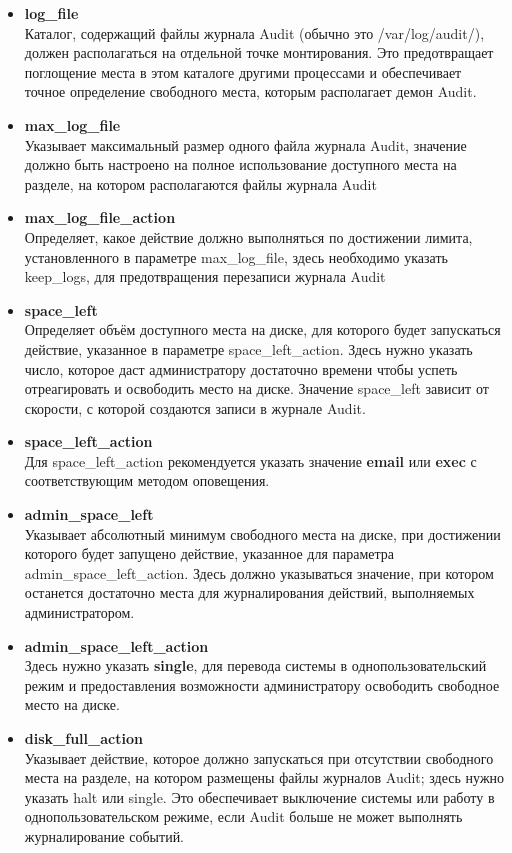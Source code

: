 \documentclass[a4paper,10pt,twoside]{article}
\begin{document}
\begin{itemize}
 \item \textbf{log\_file}\\
Каталог, содержащий файлы журнала Audit (обычно это /var/log/audit/), должен располагаться на отдельной точке монтирования. Это предотвращает поглощение места в этом каталоге другими процессами и обеспечивает точное определение свободного места, которым располагает демон Audit. 
\item \textbf{max\_log\_file}\\
Указывает максимальный размер одного файла журнала Audit, значение должно быть настроено на полное использование доступного места на разделе, на котором располагаются файлы журнала Audit  
\item \textbf{max\_log\_file\_action}\\
Определяет, какое действие должно выполняться по достижении лимита, установленного в параметре max\_log\_file, здесь необходимо указать keep\_logs, для предотвращения перезаписи журнала Audit 
\item \textbf{space\_left}\\
Определяет объём доступного места на диске, для которого будет запускаться действие, указанное в параметре space\_left\_action. Здесь нужно указать число, которое даст администратору достаточно времени чтобы успеть отреагировать и освободить место на диске. Значение space\_left зависит от скорости, с которой создаются записи в журнале Audit.
\item \textbf{space\_left\_action}\\
Для space\_left\_action рекомендуется указать значение \textbf{email} или \textbf{exec} с соответствующим методом оповещения.
\item \textbf{admin\_space\_left}\\
Указывает абсолютный минимум свободного места на диске, при достижении которого будет запущено действие, указанное для параметра admin\_space\_left\_action. Здесь должно указываться значение, при котором останется достаточно места для журналирования действий, выполняемых администратором.
\item \textbf{admin\_space\_left\_action}\\
Здесь нужно указать \textbf{single}, для перевода системы в однопользовательский режим и предоставления возможности администратору освободить свободное место на диске.
\item \textbf{disk\_full\_action}\\
 Указывает действие, которое должно запускаться при отсутствии свободного места на разделе, на котором размещены файлы журналов Audit; здесь нужно указать  halt или single. Это обеспечивает выключение системы или работу в однопользовательском режиме, если Audit больше не может выполнять журналирование событий.

\end{itemize}
\end{document}
